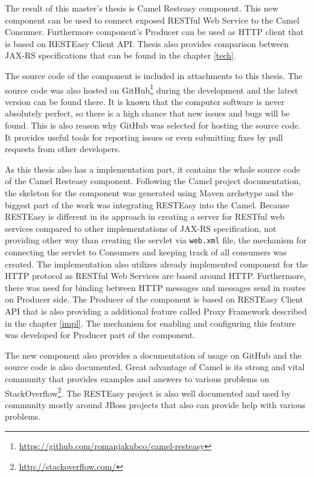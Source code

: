 \documentclass[12pt,final,oneside]{fithesis2}
\begin{document}
The result of this master's thesis is Camel Resteasy component. This new component can be used to connect exposed RESTful Web Service to the Camel Consumer. Furthermore component's Producer can be used as HTTP client that is based on RESTEasy Client API. Thesis also provides comparison between JAX-RS specifications that can be found in the chapter \ref{tech}. 

The source code of the component is included in attachments to this thesis. The source code was also hosted on GitHub\footnote{\url{https://github.com/romanjakubco/camel-resteasy}} during the development and the latest version can be found there. It is known that the computer software is never absolutely perfect, so there is a high chance that new issues and bugs will be found. This is also reason why GitHub was selected for hosting the source code. It provides useful tools for reporting issues or even submitting fixes by pull requests from other developers.  

As this thesis also has a implementation part, it contains the whole source code of the Camel Resteasy component. Following  the Camel project documentation, the skeleton for the component was generated using Maven archetype and the biggest part of the work was integrating RESTEasy into the Camel. Because RESTEasy is different in its approach in creating a server for RESTful web services compared to other implementations of JAX-RS specification, not providing other way than creating the servlet via \texttt{web.xml} file, the mechanism for connecting the servlet to Consumers and keeping track of all consumers was created. The implementation also utilizes already implemented component for the HTTP protocol as RESTful Web Services are based around HTTP. Furthermore, there was need for binding between HTTP messages and messages send in routes on Producer side. The Producer of the component is based on RESTEasy Client API that is also providing a additional feature called Proxy Framework described in the chapter \ref{impl}. The mechanism for enabling and configuring this feature was developed for Producer part of the component.

The new component also provides a documentation of usage on GitHub and the source code is also documented. Great advantage of Camel is its strong and vital community that provides examples and answers to various problems on StackOverflow\footnote{\url{http://stackoverflow.com/}}. The RESTEasy project is also well documented and used by community mostly around JBoss projects that also can provide help with various problems.
\end{document}
